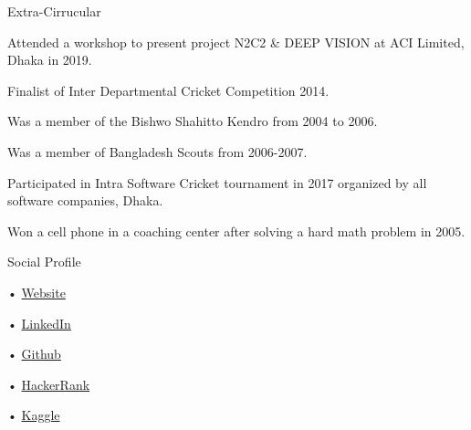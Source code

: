 \documentclass{resume} %
\begin{document}
\begin{rSection}{Extra-Cirrucular} \itemsep -3pt
\item Attended a workshop to present project N2C2 \& DEEP VISION at ACI Limited, Dhaka in 2019.
\item Finalist of Inter Departmental Cricket Competition 2014.
\item Was a member of the Bishwo Shahitto Kendro from 2004 to 2006.
\item Was a member of Bangladesh Scouts from 2006-2007.
\item  Participated in Intra Software Cricket tournament in 2017 organized by all software companies, Dhaka.
\item Won a cell phone in a coaching center after solving a hard math problem in 2005.

\end{rSection}


\begin{rSection}{Social Profile}
\item[•] \href{https://imsazzad.github.io/}{Website}
\item[•] \href{https://www.linkedin.com/in/md-abdul-hasib-sazzad-19b88099/}{LinkedIn}
\item[•] \href{https://github.com/imsazzad/}{Github}
\item[•] \href{https://www.hackerrank.com/SazzadBuet08}{HackerRank}
\item[•] \href{https://www.kaggle.com/sazzadabdulhasib}{Kaggle}
\end{rSection}
\end{document}
